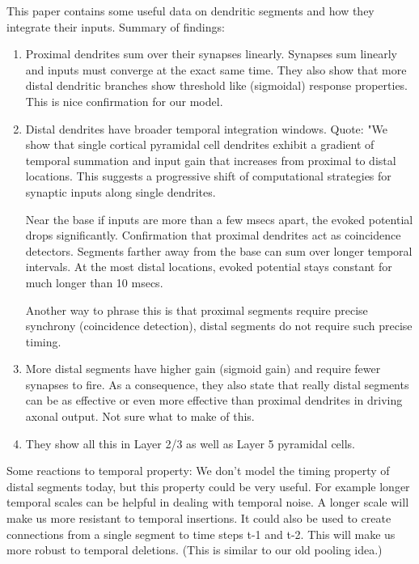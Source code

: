 \documentclass{article} %
\begin{document}
This paper \cite{Branco2011} contains some useful data on dendritic segments
and how they integrate their inputs. Summary of findings:

\begin{enumerate}

\item Proximal dendrites sum over their synapses linearly. Synapses sum linearly
and inputs must converge at the exact same time. They also show that more distal
dendritic branches show threshold like (sigmoidal) response properties. This is
nice confirmation for our model.

\item Distal dendrites have broader temporal integration windows. Quote: "We show
that single cortical pyramidal cell dendrites exhibit a gradient of temporal
summation and input gain that increases from proximal to distal locations. This
suggests a progressive shift of computational strategies for synaptic inputs
along single dendrites.

Near the base if inputs are more than a few msecs apart, the evoked potential
drops significantly. Confirmation that proximal dendrites act as coincidence
detectors. Segments farther away from the base can sum over longer temporal
intervals. At the most distal locations, evoked potential stays constant for
much longer than 10 msecs.

Another way to phrase this is that proximal segments require precise synchrony
(coincidence detection), distal segments do not require such precise timing.


\item More distal segments have higher gain (sigmoid gain) and require fewer
synapses to fire. As a consequence, they also state that really distal segments
can be as effective or even more effective than proximal dendrites in driving
axonal output. Not sure what to make of this.


\item They show all this in Layer 2/3 as well as Layer 5 pyramidal cells.

\end{enumerate}

Some reactions to temporal property: We don't model the timing property of
distal segments today, but this property could be very useful. For example
longer temporal scales can be helpful in dealing with temporal noise. A longer
scale will make us more resistant to temporal insertions. It could also be used
to create connections from a single segment to time steps t-1 and t-2. This will
make us more robust to temporal deletions. (This is similar to our old
pooling idea.)
\end{document}
